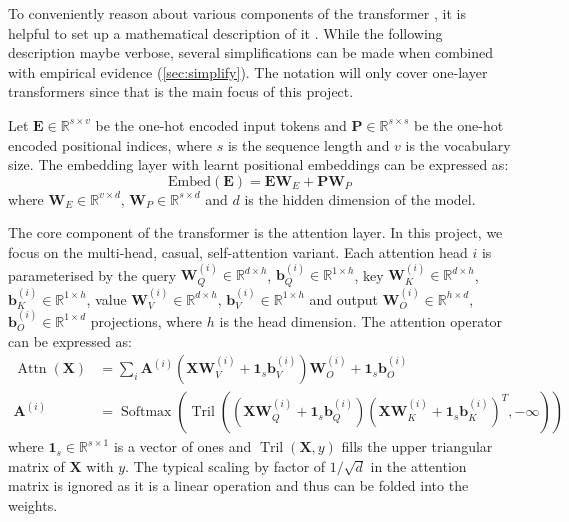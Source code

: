 \documentclass{article}
\renewcommand{\v}[1]{\mathbf{\bm{#1}}}
\newcommand{\m}[1]{\mathbf{\bm{#1}}}
\newcommand{\R}{\mathbb{R}}
\DeclareMathOperator{\softmax}{Softmax}
\DeclareMathOperator{\tril}{Tril}
\DeclareMathOperator{\attn}{Attn}
\begin{document}
To conveniently reason about various components of the transformer \citep{vaswani2017attention}, it is helpful to set up a mathematical description of it \citep{elhage2021mathematical}. While the following description maybe verbose, several simplifications can be made when combined with empirical evidence (\cref{sec:simplify}). The notation will only cover one-layer transformers since that is the main focus of this project.

Let $\m{E} \in \R^{s \times v}$ be the one-hot encoded input tokens and $\m{P} \in \R^{s \times s}$ be the one-hot encoded positional indices, where $s$ is the sequence length and $v$ is the vocabulary size. The embedding layer with learnt positional embeddings can be expressed as:
\begin{equation}  \label{eq:embed}
    \text{Embed}(\m{E}) = \m{E} \m{W}_E + \m{P} \m{W}_P
\end{equation}
where $\m{W}_E \in \R^{v \times d}$, $\m{W}_P \in \R^{s \times d}$ and $d$ is the hidden dimension of the model.

The core component of the transformer is the attention layer. In this project, we focus on the multi-head, casual, self-attention variant. Each attention head $i$ is parameterised by the query $\m{W}_Q^{(i)} \in \R^{d \times h}$, $\v{b}_Q^{(i)} \in \R^{1 \times h}$, key $\m{W}_K^{(i)} \in \R^{d \times h}$, $\v{b}_K^{(i)} \in \R^{1 \times h}$, value $\m{W}_V^{(i)} \in \R^{d \times h}$, $\v{b}_V^{(i)} \in \R^{1 \times h}$ and output $\m{W}_O^{(i)} \in \R^{h \times d}$, $\v{b}_O^{(i)} \in \R^{1 \times d}$ projections, where $h$ is the head dimension. The attention operator can be expressed as:
\begin{equation}  \label{eq:attn}
    \begin{aligned}
        \attn(\m{X})
         & = \sum_i \m{A}^{(i)} (\m{X} \m{W}_V^{(i)} + \v{1}_s \v{b}_V^{(i)}) \m{W}_O^{(i)} + \v{1}_s \v{b}_O^{(i)} \\
        \m{A}^{(i)}
         & = \softmax\left(
        \tril\left(
        \left(\m{X} \m{W}_Q^{(i)} + \v{1}_s \v{b}_Q^{(i)}\right)
        \left(\m{X} \m{W}_K^{(i)} + \v{1}_s \v{b}_K^{(i)}\right)^T
        , -\infty\right)
        \right)
    \end{aligned}
\end{equation}
where $\v{1}_s \in \R^{s \times 1}$ is a vector of ones and $\tril(\m{X}, y)$ fills the upper triangular matrix of $\m{X}$ with $y$. The typical scaling by factor of $1/\sqrt{d}$ in the attention matrix is ignored as it is a linear operation and thus can be folded into the weights.
\end{document}

